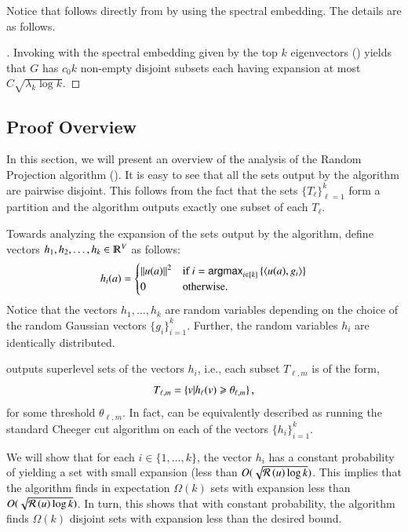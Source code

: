 \documentclass[11pt]{article}
\newcommand{\ralsymb}{\cR}
\newcommand{\ral}[1]{\ralsymb\left(#1\right)} %
\begin{document}
%
Notice that  follows directly from
 by using the spectral embedding.  The
details are as follows.
%
\begin{proof}[]
Invoking  with the spectral embedding given by the top $k$ eigenvectors 
() yields that $G$ has $c_0 k$ non-empty disjoint subsets each having expansion
at most $C \sqrt{\lambda_k \log k}$.
\end{proof}


\subsection{Proof Overview}
%
In this section, we will present an overview of the analysis of the Random
Projection algorithm ().  
%
It is easy to see that all the sets output by the algorithm are
pairwise disjoint.  This follows from the fact that the sets
$\{T_{\ell}\}_{\ell=1}^{k}$ form a partition and the algorithm outputs
exactly one subset of each $T_{\ell}$.

Towards analyzing the expansion of the sets output by the algorithm,
define vectors $h_1, h_2, \ldots, h_k \in \R^V$ as follows:
		\[ h_i(a) = \begin{cases}
				\left\lVert u(a)\right\rVert^2 & \textrm{if } i = {\sf
				argmax}_{i \in [k]}  \left\{
					\left\langle u(a), g_i\right\rangle  \right\} \\
					0 &  \textrm{otherwise.}
				\end{cases} \]
Notice that the vectors $h_1, \ldots , h_k$ are random variables
depending on the choice of the random Gaussian vectors
$\{g_i\}_{i=1}^k$.  Further, the random variables $h_i$ are
identically distributed. 

 outputs superlevel sets of the vectors
$h_i$, i.e., each subset $T_{\ell,m}$ is of the form,
$$ T_{\ell,m} = \{ v | h_\ell(v) \geqslant \theta_{\ell,m} \} \,,$$ 
for some threshold $\theta_{\ell,m}$.  In fact,
 can be equivalently described as
running the standard Cheeger cut algorithm on each of the vectors
$\{h_i\}_{i=1}^k$.

We will show that for each $i \in \{1,\ldots,k\}$, the vector $h_i$
has a constant probability of yielding a set with small expansion
(less than $O(\sqrt{\ral{u} \log k})$.  This implies that the
algorithm finds in expectation $\Omega(k)$ sets with expansion less
than $O(\sqrt{\ral{u} \log k})$.  In turn, this shows that with
constant probability, the algorithm finds $\Omega(k)$ disjoint sets
with expansion less than the desired bound.
\end{document}
